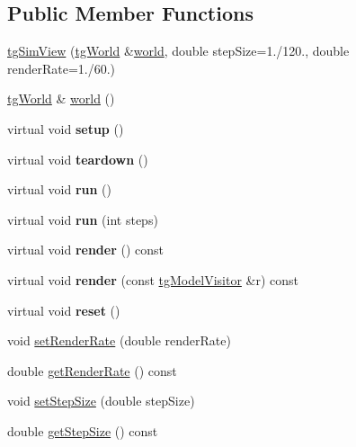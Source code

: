 \subsection*{Public Member Functions}
\begin{DoxyCompactItemize}
\item 
\hyperlink{classtg_sim_view_a1cee9802a8b8c483588a9fd2ebacbde9}{tg\-Sim\-View} (\hyperlink{classtg_world}{tg\-World} \&\hyperlink{classtg_sim_view_a349682d852193ee75f416ab07c2d4a62}{world}, double step\-Size=1./120., double render\-Rate=1./60.)
\item 
\hyperlink{classtg_world}{tg\-World} \& \hyperlink{classtg_sim_view_a349682d852193ee75f416ab07c2d4a62}{world} ()
\item 
\hypertarget{classtg_sim_view_a7f848d5d40446d497950a194c9ac08d3}{virtual void {\bfseries setup} ()}\label{classtg_sim_view_a7f848d5d40446d497950a194c9ac08d3}

\item 
\hypertarget{classtg_sim_view_a6a8a2a8848b5e95bd2fd257d35dd2818}{virtual void {\bfseries teardown} ()}\label{classtg_sim_view_a6a8a2a8848b5e95bd2fd257d35dd2818}

\item 
\hypertarget{classtg_sim_view_a7e72ecacfc26f6e0b43ba4d08c7af31d}{virtual void {\bfseries run} ()}\label{classtg_sim_view_a7e72ecacfc26f6e0b43ba4d08c7af31d}

\item 
\hypertarget{classtg_sim_view_af029194676d37d522f534bfbb2b17f0e}{virtual void {\bfseries run} (int steps)}\label{classtg_sim_view_af029194676d37d522f534bfbb2b17f0e}

\item 
\hypertarget{classtg_sim_view_a7bf87646393669230e8fabad93c0a28a}{virtual void {\bfseries render} () const }\label{classtg_sim_view_a7bf87646393669230e8fabad93c0a28a}

\item 
\hypertarget{classtg_sim_view_a56670457205774668e538fa161bb02ad}{virtual void {\bfseries render} (const \hyperlink{classtg_model_visitor}{tg\-Model\-Visitor} \&r) const }\label{classtg_sim_view_a56670457205774668e538fa161bb02ad}

\item 
\hypertarget{classtg_sim_view_a31c6722e7c7939925ce6d4115b9a984c}{virtual void {\bfseries reset} ()}\label{classtg_sim_view_a31c6722e7c7939925ce6d4115b9a984c}

\item 
void \hyperlink{classtg_sim_view_a124c599e7618649152438b3e85b1751f}{set\-Render\-Rate} (double render\-Rate)
\item 
double \hyperlink{classtg_sim_view_a2c8fe5bf37fe3e4c1363a79d64562a74}{get\-Render\-Rate} () const 
\item 
void \hyperlink{classtg_sim_view_a57146a5d1870729f032ed837cd12b249}{set\-Step\-Size} (double step\-Size)
\item 
double \hyperlink{classtg_sim_view_a06d8813edb22889a2b05f6930ee8b1c5}{get\-Step\-Size} () const 
\end{DoxyCompactItemize}
